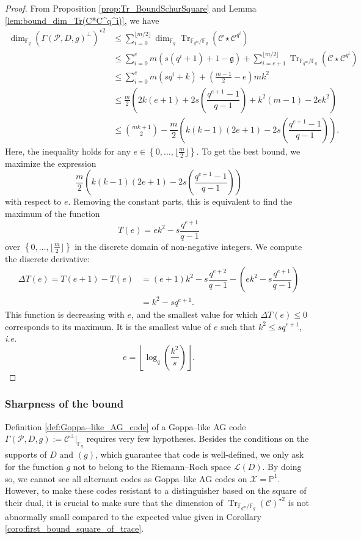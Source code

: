 \documentclass[a4paper]{amsart}
\theoremstyle{definition}
\theoremstyle{remark}
\newcommand{\calP}{\mathcal{P}}
\newcommand{\calL}{\mathcal{L}}
\newcommand{\calC}{\mathcal{C}}
\newcommand{\calX}{\mathcal{X}}
\newcommand{\fq}{\mathbb{F}_{q}}
\newcommand{\PP}{\mathbb{P}}
\newcommand{\Tr}[1]{\operatorname{Tr}_{\mathbb{F}_{q^m}/\fq}\left(#1\right)}
\newcommand{\set}[1]{\left\{#1\right\}}
\begin{document}
\begin{proof}
    From Proposition \ref{prop:Tr_BoundSchurSquare} and Lemma \ref{lem:bound_dim_Tr(C*C^q^i)}, we have 
    \begin{align*}
        \dim_{\fq}(\Gamma(\calP,D,g)^{\perp})^{\star 2}
        & \leq \sum\limits_{i=0}^{\lfloor m/2 \rfloor} \dim_{\fq} \Tr{\calC \star \calC^{q^i}} \\
        & \leq \sum\limits_{i=0}^{e} m(s(q^i+1)+1-\mathfrak{g})  + \sum\limits_{i=e+1}^{\lfloor m/2 \rfloor} \Tr{\calC \star \calC^{q^i}} \\
        & \leq \sum\limits_{i=0}^{e} m(sq^i+k) + \left( \frac{m-1}{2} -e \right)mk^2 \\
        & \leq \frac{m}{2}\left(2k(e+1)+2s\left(\dfrac{q^{e+1}-1}{q-1}\right)+k^2(m-1)-2ek^2  \right) \\
        & \leq \binom{mk+1}{2} -  \dfrac{m}{2}\left(k(k-1)(2e+1)-2s\left(\dfrac{q^{e+1}-1}{q-1}\right)\right).
    \end{align*}
Here, the inequality holds for any $e \in \set{0,\dots,\lfloor \frac{m}{2} \rfloor}$. To get the best bound, we maximize the expression $$ \dfrac{m}{2}\left(k(k-1)(2e+1)-2s\left(\dfrac{q^{e+1}-1}{q-1}\right)\right)$$ with respect to $e$. Removing the constant parts, this is equivalent to find the maximum of the function
$$T(e) = ek^2-s\dfrac{q^{e+1}}{q-1}$$
over $\set{0,\dots,\lfloor \frac{m}{2} \rfloor}$ in the discrete domain of non-negative integers.  
We compute the discrete derivative:
\begin{align*}
    \Delta T(e) = T(e+1)-T(e) &= (e+1)k^2-s\dfrac{q^{e+2}}{q-1} - \left(ek^2-s\dfrac{q^{e+1}}{q-1}\right) \\
                              &= k^2 - sq^{e+1}.
\end{align*}
This function is decreasing with $e$, and the smallest value for which $\Delta T(e) \leq 0$ corresponds to its maximum. It is the smallest value of $e$ such that $k^2 \leq sq^{e+1}$, \emph{i.e.}
$$e =  \left\lfloor \log_q\left(\dfrac{k^2}{s}\right)\right\rfloor.$$
\end{proof}

\subsubsection{Sharpness of the bound} \label{section:sharpness}

Definition \ref{def:Goppa--like_AG_code} of a Goppa--like AG code $\Gamma(\calP,D,g) := \calC^{\perp}|_{\fq}$ requires very few hypotheses. Besides the conditions on the supports of $D$ and $(g)$, which guarantee that code is well-defined, we only ask for the function $g$ not to belong to the Riemann--Roch space $\calL(D)$. By doing so, we cannot see all alternant codes as Goppa--like AG codes on $\calX=\PP^1$. However, to make these codes resistant to a distinguisher based on the square of their dual, it is crucial to make sure that the dimension of $\Tr{\calC}^{\star 2}$ is not abnormally small compared to the expected value given in Corollary \ref{coro:first_bound_square_of_trace}.
\end{document}
